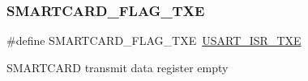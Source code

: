 \subsubsection{\texorpdfstring{S\+M\+A\+R\+T\+C\+A\+R\+D\+\_\+\+F\+L\+A\+G\+\_\+\+T\+XE}{SMARTCARD\_FLAG\_TXE}}
{\footnotesize\ttfamily \#define S\+M\+A\+R\+T\+C\+A\+R\+D\+\_\+\+F\+L\+A\+G\+\_\+\+T\+XE~\hyperlink{group___peripheral___registers___bits___definition_gab59be9f02a6e304a82da3e298c6a72ab}{U\+S\+A\+R\+T\+\_\+\+I\+S\+R\+\_\+\+T\+XE}}

S\+M\+A\+R\+T\+C\+A\+RD transmit data register empty 